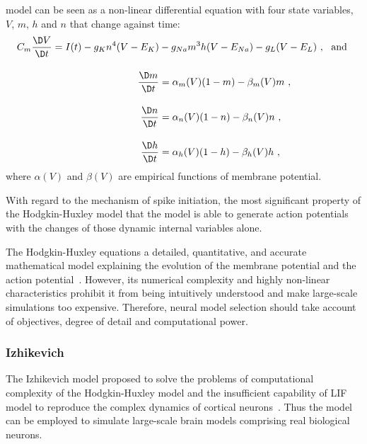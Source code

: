 \DIFdelend \DIFaddbegin {}\DIFaddend model can be seen as a non-linear differential equation with four state variables, $V$, $m$, $h$ and $n$ that change against time:
\begin{equation}
\begin{aligned}
C_m \dfrac{\D V}{\D t} = I(t) - g_{K}n^4(V-E_{K}) &- g_{Na}m^3h(V-E_{Na}) - g_L(V-E_L)~, \textrm{~~and }\\[10pt]
\dfrac{\D m}{\D t} &= \alpha_m(V)(1-m) - \beta_m(V)m~, \\[10pt]
\dfrac{\D n}{\D t} &= \alpha_n(V)(1-n) - \beta_n(V)n~, \\[10pt]
\dfrac{\D h}{\D t} &= \alpha_h(V)(1-h) - \beta_h(V)h~,
\end{aligned}
\end{equation} 
where $\alpha(V)$ and  $\beta(V)$ are empirical functions of membrane potential.
\DIFaddbegin 

\DIFaddend With regard to the mechanism of spike initiation, \DIFdelbegin {}\DIFdelend the most significant property of the Hodgkin-Huxley model \DIFaddbegin {}\DIFaddend that the model is able to generate action potentials with the changes of those dynamic internal variables alone.

The Hodgkin-Huxley equations \DIFdelbegin {}\DIFdelend \DIFaddbegin {}\DIFaddend a detailed, quantitative, and \DIFdelbegin {}\DIFdelend \DIFaddbegin {}\DIFaddend accurate mathematical model explaining the evolution of the membrane potential and the action potential~\citep{byrne2014molecules}.
However, its numerical complexity and highly non-linear characteristics prohibit it from being intuitively understood and make large-scale simulations too expensive.
Therefore, neural model selection should take account of objectives, degree of detail and computational power.

\subsubsection{Izhikevich \DIFaddbegin {}\DIFaddend }
The Izhikevich model \DIFdelbegin {}\DIFdelend \DIFaddbegin {}\DIFaddend proposed to solve the problems of computational complexity of the Hodgkin-Huxley model and the insufficient capability of LIF model to reproduce the complex dynamics of cortical neurons~\citep{izhikevich2003simple}.
Thus the model can be employed to simulate large-scale brain models comprising \DIFdelbegin {}\DIFdelend real biological neurons.

